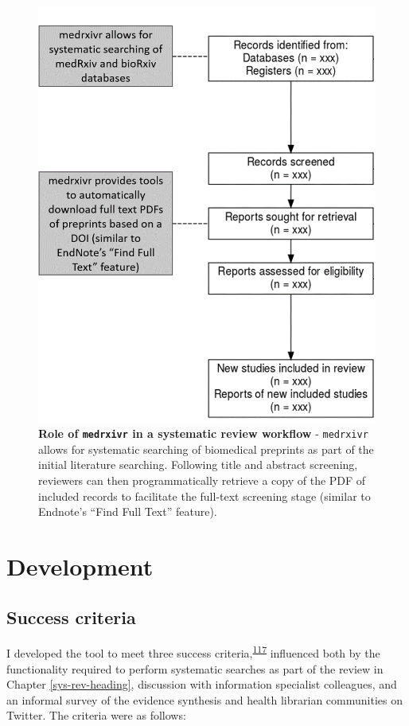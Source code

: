 \documentclass[a4paper, twoside]{templates/ociamthesis}
\begin{document}
\begin{figure}

{\centering \includegraphics[width=0.65\linewidth]{figures/sys-rev-tools/medrxiv-role} 

}

\caption[Role of \texttt{medrxivr} in a systematic review workflow]{\textbf{Role of \texttt{medrxivr} in a systematic review workflow} - \texttt{medrxivr} allows for systematic searching of biomedical preprints as part of the initial literature searching. Following title and abstract screening, reviewers can then programmatically retrieve a copy of the PDF of included records to facilitate the full-text screening stage (similar to Endnote's ``Find Full Text'' feature).}\label{fig:medrxivr-sr}
\end{figure}

\hypertarget{development}{%
\section{Development}\label{development}}

\hypertarget{success-criteria}{%
\subsection{Success criteria}\label{success-criteria}}

I developed the tool to meet three success criteria,\textsuperscript{\protect\hyperlink{ref-wateridge1995}{117}} influenced both by the functionality required to perform systematic searches as part of the review in Chapter \ref{sys-rev-heading}, discussion with information specialist colleagues, and an informal survey of the evidence synthesis and health librarian communities on Twitter. The criteria were as follows:
\end{document}

